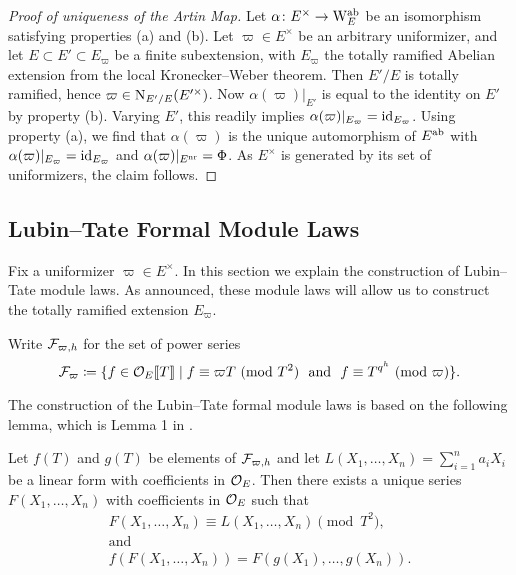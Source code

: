 \documentclass[../main.tex]{subfiles}
\begin{document}
\begin{proof}[Proof of uniqueness of the Artin Map]
  Let $\alpha\colon E^\times \to \mathrm W_E^{\mathrm{ab}}$ be
  an isomorphism
  satisfying properties (a) and (b). Let $\varpi \in E^\times$ be an arbitrary
  uniformizer, and let $E \subset E' \subset E_\varpi$ be a finite subextension, 
  with $E_\varpi$ the totally ramified Abelian extension from the local Kronecker--Weber
  theorem. Then $E'/E$ is totally ramified, hence $\varpi \in
  \mathrm{N}_{E'/E}(E'^\times)$. Now $\alpha(\varpi)|_{E'}$ is equal to the identity on $E'$
  by property (b). Varying $E'$, this readily implies $\alpha(\varpi)|_{E_\varpi} =
  \operatorname{id}_{E_\varpi}$. Using property (a), we find that $\alpha(\varpi)$ is the unique
  automorphism of $E^{\mathrm{ab}}$ with $\alpha(\varpi)|_{E_\varpi} = \operatorname{id}_{E_\varpi}$ and
  $\alpha(\varpi)|_{E^{\mathrm{nr}}} = \Phi$. As $E^\times$ is generated by its set of
  uniformizers, the claim follows.
\end{proof}

\subsection{Lubin--Tate Formal Module Laws} %
\label{sub:Lubin--Tate Formal Module Laws}
Fix a uniformizer $\varpi \in E^\times$. In this section we explain the construction
of Lubin--Tate module laws. As announced, these module laws will allow us to
construct the totally ramified extension $E_\varpi$.

Write $\mathcal{F}_{\varpi, h}$ for the set of power series
\begin{equation*}
  \cF_\varpi \coloneqq \{f \in \cO_E \llbr T \rrbr \mid f \equiv \varpi T
    \ (\text{mod } {T^2}) \ \text{ and } \ 
    f \equiv T^{q^h} \ (\text{mod }\varpi)\}. 
\end{equation*}

The construction of the Lubin--Tate formal module laws is based on the following 
lemma, which is Lemma 1 in \cite{LubinTateFormalMult}.
\begin{lem}\label{lem:LTLemma1}
  Let $f(T)$ and $g(T)$ be elements of $\mathcal{F}_{\varpi,h}$ and let 
  $L(X_1, \dots, X_n) = \sum_{i=1}^n a_i X_i$ be a linear form with coefficients in 
  ${\mathcal{O}_E}$. Then there exists a unique series $F(X_1, \dots, X_n)$ with coefficients 
  in ${\mathcal{O}_E}$ such that 
  \begin{gather*}
    F(X_1, \dots, X_n) \equiv L(X_1, \dots, X_n) \pmod {T^2}, \\ \text{and} \\
    f(F(X_1, \dots, X_n)) = F(g(X_1), \dots, g(X_n)).
  \end{gather*}
\end{lem}
\end{document}
